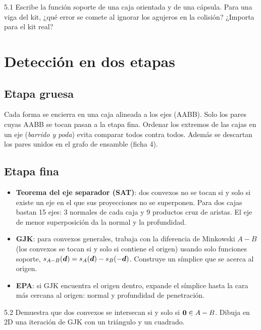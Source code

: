 \documentclass[11pt,a4paper]{article}
\begin{document}
\begin{ejercicio}{5.1}
Escribe la función soporte de una caja orientada y de una cápsula. Para una viga del kit, ¿qué error se comete al
ignorar los agujeros en la colisión? ¿Importa para el kit real?
\end{ejercicio}

\section{Detección en dos etapas}

\subsection{Etapa gruesa}
Cada forma se encierra en una caja alineada a los ejes (AABB). Solo los pares cuyas AABB se tocan pasan a la etapa
fina. Ordenar los extremos de las cajas en un eje (\emph{barrido y poda}) evita comparar todos contra todos.
Además se descartan los pares unidos en el grafo de ensamble (ficha 4).

\subsection{Etapa fina}
\begin{itemize}[leftmargin=*]
  \item \textbf{Teorema del eje separador (SAT)}: dos convexos no se tocan si y solo si existe un eje en el que sus
        proyecciones no se superponen. Para dos cajas bastan 15 ejes: 3 normales de cada caja y 9 productos cruz de
        aristas. El eje de menor superposición da la normal y la profundidad.
  \item \textbf{GJK}: para convexos generales, trabaja con la diferencia de Minkowski $A - B$ (los convexos se tocan
        si y solo si contiene el origen) usando solo funciones soporte, $s_{A-B}(\bm{d}) = s_A(\bm{d}) - s_B(-\bm{d})$.
        Construye un símplice que se acerca al origen.
  \item \textbf{EPA}: si GJK encuentra el origen dentro, expande el símplice hasta la cara más cercana al origen:
        normal y profundidad de penetración.
\end{itemize}

\begin{ejercicio}{5.2}
Demuestra que dos convexos se intersecan si y solo si $\bm{0}\in A - B$. Dibuja en 2D una iteración de GJK con un
triángulo y un cuadrado.
\end{ejercicio}
\end{document}
